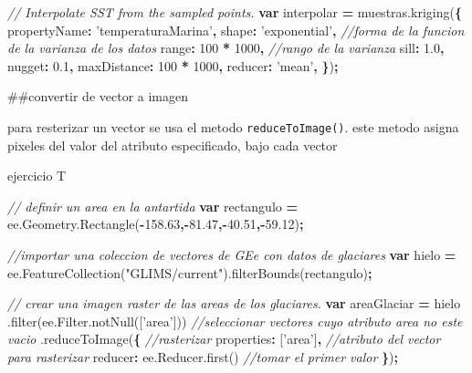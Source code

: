 \documentclass[
]{article}
\newenvironment{Shaded}{\begin{snugshade}}{\end{snugshade}}
\newcommand{\AttributeTok}[1]{\textcolor[rgb]{0.77,0.63,0.00}{#1}}
\newcommand{\CommentTok}[1]{\textcolor[rgb]{0.56,0.35,0.01}{\textit{#1}}}
\newcommand{\DataTypeTok}[1]{\textcolor[rgb]{0.13,0.29,0.53}{#1}}
\newcommand{\DecValTok}[1]{\textcolor[rgb]{0.00,0.00,0.81}{#1}}
\newcommand{\FloatTok}[1]{\textcolor[rgb]{0.00,0.00,0.81}{#1}}
\newcommand{\KeywordTok}[1]{\textcolor[rgb]{0.13,0.29,0.53}{\textbf{#1}}}
\newcommand{\NormalTok}[1]{#1}
\newcommand{\OperatorTok}[1]{\textcolor[rgb]{0.81,0.36,0.00}{\textbf{#1}}}
\newcommand{\StringTok}[1]{\textcolor[rgb]{0.31,0.60,0.02}{#1}}
\newcommand{\VariableTok}[1]{\textcolor[rgb]{0.00,0.00,0.00}{#1}}
\begin{document}
\begin{Shaded}
\begin{Highlighting}[]
\CommentTok{// Interpolate SST from the sampled points.}
\KeywordTok{var}\NormalTok{ interpolar }\OperatorTok{=} \VariableTok{muestras}\NormalTok{.}\AttributeTok{kriging}\NormalTok{(}\OperatorTok{\{}
  \DataTypeTok{propertyName}\OperatorTok{:} \StringTok{'temperaturaMarina'}\OperatorTok{,}
  \DataTypeTok{shape}\OperatorTok{:} \StringTok{'exponential'}\OperatorTok{,} \CommentTok{//forma de la funcion de la varianza de los datos}
  \DataTypeTok{range}\OperatorTok{:} \DecValTok{100} \OperatorTok{*} \DecValTok{1000}\OperatorTok{,} \CommentTok{//rango de la varianza}
  \DataTypeTok{sill}\OperatorTok{:} \FloatTok{1.0}\OperatorTok{,}
  \DataTypeTok{nugget}\OperatorTok{:} \FloatTok{0.1}\OperatorTok{,}
  \DataTypeTok{maxDistance}\OperatorTok{:} \DecValTok{100} \OperatorTok{*} \DecValTok{1000}\OperatorTok{,}
  \DataTypeTok{reducer}\OperatorTok{:} \StringTok{'mean'}\OperatorTok{,}
\OperatorTok{\}}\NormalTok{)}\OperatorTok{;}
\end{Highlighting}
\end{Shaded}

\#\#convertir de vector a imagen

para resterizar un vector se usa el metodo \texttt{reduceToImage()}.
este metodo asigna pixeles del valor del atributo especificado, bajo
cada vector

ejercicio T

\begin{Shaded}
\begin{Highlighting}[]
\CommentTok{// definir un area en la antartida}
\KeywordTok{var}\NormalTok{ rectangulo }\OperatorTok{=} \VariableTok{ee}\NormalTok{.}\VariableTok{Geometry}\NormalTok{.}\AttributeTok{Rectangle}\NormalTok{(}\OperatorTok{-}\FloatTok{158.63}\OperatorTok{,-}\FloatTok{81.47}\OperatorTok{,-}\FloatTok{40.51}\OperatorTok{,-}\FloatTok{59.12}\NormalTok{)}\OperatorTok{;}

\CommentTok{//importar una coleccion de vectores de GEe con datos de glaciares}
\KeywordTok{var}\NormalTok{ hielo }\OperatorTok{=} \VariableTok{ee}\NormalTok{.}\AttributeTok{FeatureCollection}\NormalTok{(}\StringTok{"GLIMS/current"}\NormalTok{).}\AttributeTok{filterBounds}\NormalTok{(rectangulo)}\OperatorTok{;}

\CommentTok{// crear una imagen raster de las areas de los glaciares.}
\KeywordTok{var}\NormalTok{ areaGlaciar }\OperatorTok{=}\NormalTok{ hielo}
\NormalTok{  .}\AttributeTok{filter}\NormalTok{(}\VariableTok{ee}\NormalTok{.}\VariableTok{Filter}\NormalTok{.}\AttributeTok{notNull}\NormalTok{([}\StringTok{'area'}\NormalTok{])) }\CommentTok{//seleccionar vectores cuyo atributo area no este vacio }
\NormalTok{  .}\AttributeTok{reduceToImage}\NormalTok{(}\OperatorTok{\{} \CommentTok{//rasterizar}
    \DataTypeTok{properties}\OperatorTok{:}\NormalTok{ [}\StringTok{'area'}\NormalTok{]}\OperatorTok{,} \CommentTok{//atributo del vector para rasterizar}
    \DataTypeTok{reducer}\OperatorTok{:} \VariableTok{ee}\NormalTok{.}\VariableTok{Reducer}\NormalTok{.}\AttributeTok{first}\NormalTok{() }\CommentTok{//tomar el primer valor }
\OperatorTok{\}}\NormalTok{)}\OperatorTok{;}
\end{Highlighting}
\end{Shaded}
\end{document}
